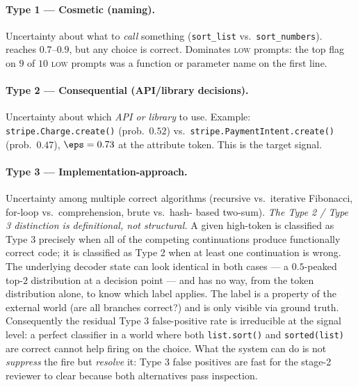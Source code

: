 \paragraph{Type 1 --- Cosmetic (naming).} Uncertainty about what to
\emph{call} something (\texttt{sort\_list} vs.\ \texttt{sort\_numbers}).
\eps reaches $0.7$--$0.9$, but any choice is correct. Dominates
\textsc{low} prompts: the top flag on $9$ of $10$ \textsc{low} prompts
was a function or parameter name on the first line.

\paragraph{Type 2 --- Consequential (API/library decisions).}
Uncertainty about which \emph{API or library} to use. Example:
\texttt{stripe.Charge.create()} (prob.\ $0.52$) vs.\
\texttt{stripe.PaymentIntent.create()} (prob.\ $0.47$), $\eps =
0.73$ at the attribute token. This is the target signal.

\paragraph{Type 3 --- Implementation-approach.}
Uncertainty among multiple correct algorithms (recursive vs.\
iterative Fibonacci, for-loop vs.\ comprehension, brute vs.\ hash-%
based two-sum). \emph{The Type 2 / Type 3 distinction is
definitional, not structural.} A given high-\eps token is classified
as Type 3 precisely when all of the competing continuations produce
functionally correct code; it is classified as Type 2 when at least
one continuation is wrong. The underlying decoder state can look
identical in both cases --- a $0.5$-peaked top-$2$ distribution at a
decision point --- and \eps has no way, from the token distribution
alone, to know which label applies. The label is a property of the
external world (are all branches correct?) and is only visible via
ground truth. Consequently the residual Type 3 false-positive rate
is irreducible at the signal level: a perfect classifier in a world
where both \texttt{list.sort()} and \texttt{sorted(list)} are correct
cannot help firing on the choice. What the system can do is not
\emph{suppress} the fire but \emph{resolve} it: Type 3 false
positives are fast for the stage-2 reviewer to clear because both
alternatives pass inspection.

